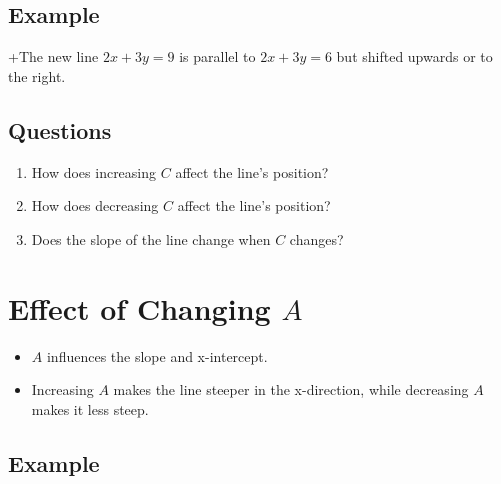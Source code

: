 \documentclass[12pt]{article}
\begin{document}
\subsection*{Example}


+The new line \(2x + 3y = 9\) is parallel to \(2x + 3y = 6\) but shifted upwards or to the right.

\subsection*{Questions}
\begin{enumerate}
    \item How does increasing \(C\) affect the line's position?
    \item How does decreasing \(C\) affect the line's position?
    \item Does the slope of the line change when \(C\) changes?
\end{enumerate}

\newpage

\section*{Effect of Changing \(A\)}

\begin{itemize}
    \item \(A\) influences the slope and x-intercept.
    \item Increasing \(A\) makes the line steeper in the x-direction, while decreasing \(A\) makes it less steep.
\end{itemize}

\subsection*{Example}

\end{document}
